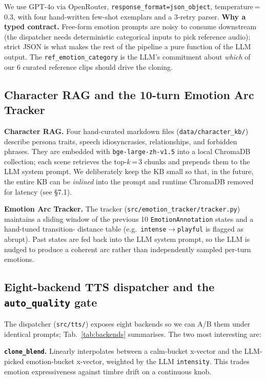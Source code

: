 \documentclass[10pt,a4paper]{article}
\begin{document}
We use GPT-4o via OpenRouter, \texttt{response\_format=json\_object},
temperature\,=\,0.3, with four hand-written few-shot exemplars and a 3-retry
parser. \textbf{Why a typed contract.} Free-form emotion prompts are noisy
to consume downstream (the dispatcher needs deterministic categorical
inputs to pick reference audio); strict JSON is what makes the rest of the
pipeline a pure function of the LLM output. The
\texttt{ref\_emotion\_category} is the LLM's commitment about \emph{which}
of our 6 curated reference clips should drive the cloning.

\subsection{Character RAG and the 10-turn Emotion Arc Tracker}

\textbf{Character RAG.} Four hand-curated markdown files
(\texttt{data/character\_kb/}) describe persona traits, speech idiosyncrasies,
relationships, and forbidden phrases. They are embedded with
\texttt{bge-large-zh-v1.5} into a local ChromaDB collection; each scene
retrieves the top-$k$\,=\,3 chunks and prepends them to the LLM system
prompt. We deliberately keep the KB small so that, in the future, the entire
KB can be \emph{inlined} into the prompt and runtime ChromaDB removed for
latency (see \S7.1).

\textbf{Emotion Arc Tracker.} The tracker
(\texttt{src/emotion\_tracker/tracker.py}) maintains a sliding window of the
previous 10 \texttt{EmotionAnnotation} states and a hand-tuned transition-
distance table (e.g.\ \texttt{intense}$\to$\texttt{playful} is flagged as
abrupt). Past states are fed back into the LLM system prompt, so the LLM is
nudged to produce a coherent arc rather than independently sampled per-turn
emotions.

\subsection{Eight-backend TTS dispatcher and the \texttt{auto\_quality} gate}

The dispatcher (\texttt{src/tts/}) exposes eight backends so we can A/B them
under identical prompts; Tab.~\ref{tab:backends} summarises. The two most
interesting are:

\textbf{\texttt{clone\_blend}.} Linearly interpolates between a calm-bucket
x-vector and the LLM-picked emotion-bucket x-vector, weighted by the LLM
\texttt{intensity}. This trades emotion expressiveness against timbre drift
on a continuous knob.
\end{document}
